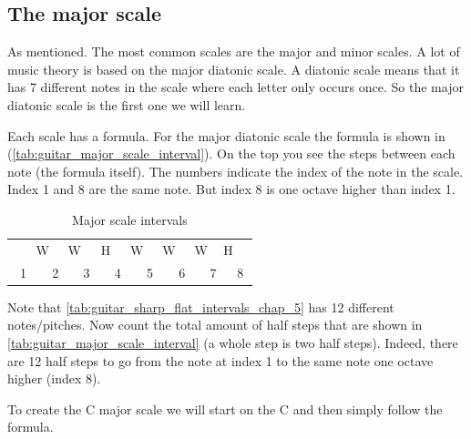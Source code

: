 \subsection{The major scale}

As mentioned. The most common scales are the major and minor scales. A lot of music theory is based on the major diatonic scale. A diatonic scale means that it has 7 different notes in the scale where each letter only occurs once. So the major diatonic scale is the first one we will learn.

Each scale has a formula. For the major diatonic scale the formula is shown in (\autoref{tab:guitar_major_scale_interval}). On the top you see the steps between each note (the formula itself). The numbers indicate the index of the note in the scale. Index 1 and 8 are the same note. But index 8 is one octave higher than index 1.

\begin{table}[h]
	\centering
	\begin{tabular}{*{16}{c}}
		& \multicolumn{2}{P{4mm}}{\large{W}} & \multicolumn{2}{P{4mm}}{\large{W}} & \multicolumn{2}{P{4mm}}{\large{H}} & \multicolumn{2}{P{4mm}}{\large{W}} & \multicolumn{2}{P{4mm}}{\large{W}} & \multicolumn{2}{P{4mm}}{\large{W}} & \multicolumn{2}{P{4mm}}{\large{H}} & \\
		\multicolumn{2}{P{4mm}}{1} & \multicolumn{2}{P{4mm}}{2} & \multicolumn{2}{P{4mm}}{3} & \multicolumn{2}{P{4mm}}{4} & \multicolumn{2}{P{4mm}}{5} & \multicolumn{2}{P{4mm}}{6} & \multicolumn{2}{P{4mm}}{7} & \multicolumn{2}{P{4mm}}{8}
	\end{tabular}
	\caption{Major scale intervals}
	\label{tab:guitar_major_scale_interval}
\end{table}

\newpage

Note that \autoref{tab:guitar_sharp_flat_intervals_chap_5} has 12 different notes/pitches. Now count the total amount of half steps that are shown in \autoref{tab:guitar_major_scale_interval} (a whole step is two half steps). Indeed, there are 12 half steps to go from the note at index 1 to the same note one octave higher (index 8).

To create the C major scale we will start on the C and then simply follow the formula.

